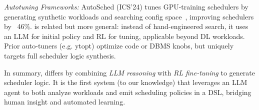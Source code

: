 \emph{Autotuning Frameworks:} AutoSched (ICS'24) tunes GPU-training schedulers by generating synthetic workloads and searching config space~\cite{tianweiz07,tianweiz07b}, improving schedulers by ~46\%. \sys{} is related but more general: instead of hand-engineered search, it uses an LLM for initial policy and RL for tuning, applicable beyond DL workloads. Prior auto-tuners (e.g. ytopt) optimize code or DBMS knobs, but \sys{} uniquely targets full scheduler logic synthesis.

In summary, \sys{} differs by combining \emph{LLM reasoning} with \emph{RL fine-tuning} to generate scheduler logic. It is the first system (to our knowledge) that leverages an LLM agent to both analyze workloads and emit scheduling policies in a DSL, bridging human insight and automated learning.
